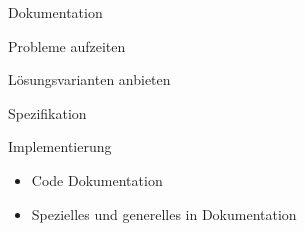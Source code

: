 \begin{frame}[t]{Dokumentation}
  \begin{bigitemize}[<+->]{3mm}
		\item Probleme aufzeiten
		\item Lösungsvarianten anbieten
		\item Spezifikation
		\item Implementierung
		\begin{itemize}
			\item Code Dokumentation
			\item Spezielles und generelles in Dokumentation
		\end{itemize}
	\end{bigitemize}
\end{frame}
